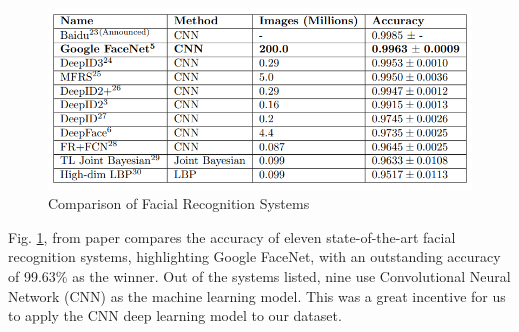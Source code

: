 \documentclass[conference]{IEEEtran}
\begin{document}
\begin{figure}[]
    \centering
    \includegraphics[scale=0.5]{images/13_balaban_table.png}
    \caption{Comparison of Facial Recognition Systems\cite{hal_paper}}
    \label{fig:balaban_table}
\end{figure}

Fig. \ref{fig:balaban_table}, from paper\cite{balaban_paper} compares the accuracy of eleven state-of-the-art facial recognition systems, highlighting Google FaceNet, with an outstanding accuracy of 99.63\% as the winner. Out of the systems listed, nine use Convolutional Neural Network (CNN) as the machine learning model. This was a great incentive for us to apply the CNN deep learning model to our dataset.
\end{document}

